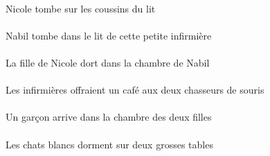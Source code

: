 \begin{exe}
\INDSgAbsP{}   \NicoleDSgAbsP{}    \DEFPlOblP{}    \DEFSgOblP{}   \litDSgOblP{}   \DEP{}   \coussinAPlOblP{}   \SURP{}  \tomberViPrsDSgP{}\\
Nicole tombe sur les coussins du lit
\ex\gll
\INDSgAbs{}   \NabilBSgAbs{}    \DEFSgObl{}    \DEMSgObl{}   \petitBSg{}   \infirmiereBSgObl{}   \DE{}   \litDSgObl{}   \DANS{}  \tomberViPrsBSg{}\\
\INDSgAbsP{}   \NabilBSgAbsP{}    \DEFSgOblP{}    \DEMSgOblP{}   \petitBSgP{}   \infirmiereBSgOblP{}   \DEP{}   \litDSgOblP{}   \DANSP{}  \tomberViPrsBSgP{}\\
Nabil tombe dans le lit de cette petite infirmière
\ex\gll
\DEFSgAbs{}    \INDSgObl{}   \NicoleDSgObl{}   \DE{}   \filleCSgAbs{}    \DEFSgObl{}    \INDSgObl{}   \NabilBSgObl{}   \DE{}   \chambreBSgObl{}   \DANS{}  \dormirViPrsCSg{}\\
\DEFSgAbsP{}    \INDSgOblP{}   \NicoleDSgOblP{}   \DEP{}   \filleCSgAbsP{}    \DEFSgOblP{}    \INDSgOblP{}   \NabilBSgOblP{}   \DEP{}   \chambreBSgOblP{}   \DANSP{}  \dormirViPrsCSgP{}\\
La fille de Nicole dort dans la chambre de Nabil
\ex\gll
\DEFPlErg{}   \infirmiereBPlErg{}    \DEFDuDat{}    \INDPlObl{}   \sourisAPlObl{}   \DE{}   \chasseurCDuDat{}   \INDSgAbs{}   \cafeDSgAbs{}  \offrirVdPstDSg{}\\
\DEFPlErgP{}   \infirmiereBPlErgP{}    \DEFDuDatP{}    \INDPlOblP{}   \sourisAPlOblP{}   \DEP{}   \chasseurCDuDatP{}   \INDSgAbsP{}   \cafeDSgAbsP{}  \offrirVdPstDSgP{}\\
Les infirmières offraient un café aux deux chasseurs de souris
\ex\gll
\INDSgAbs{}   \garconBSgAbs{}    \DEFSgObl{}    \DEFDuObl{}   \filleCDuObl{}   \DE{}   \chambreBSgObl{}   \DANS{}  \arriverViPrsBSg{}\\
\INDSgAbsP{}   \garconBSgAbsP{}    \DEFSgOblP{}    \DEFDuOblP{}   \filleCDuOblP{}   \DEP{}   \chambreBSgOblP{}   \DANSP{}  \arriverViPrsBSgP{}\\
Un garçon arrive dans la chambre des deux filles
\ex\gll
\INDDuObl{}   \grosCDu{}   \tableCDuObl{}   \SUR{}   \DEFPlAbs{}   \blancDPl{}   \chatDPlAbs{}  \dormirViPrsDPl{}\\
\INDDuOblP{}   \grosCDuP{}   \tableCDuOblP{}   \SURP{}   \DEFPlAbsP{}   \blancDPlP{}   \chatDPlAbsP{}  \dormirViPrsDPlP{}\\
Les chats blancs dorment sur deux grosses tables
\ex\gll
\INDDuObl{}   \garconBDuObl{}   \AVEC{}   \INDDuAbs{}   \filleCDuAbs{}  \arriverViPrsCDu{}\\
\INDDuOblP{}   \garconBDuOblP{}   \AVECP{}   \INDDuAbsP{}   \filleCDuAbsP{}  \arriverViPrsCDuP{}\\

\end{exe}
